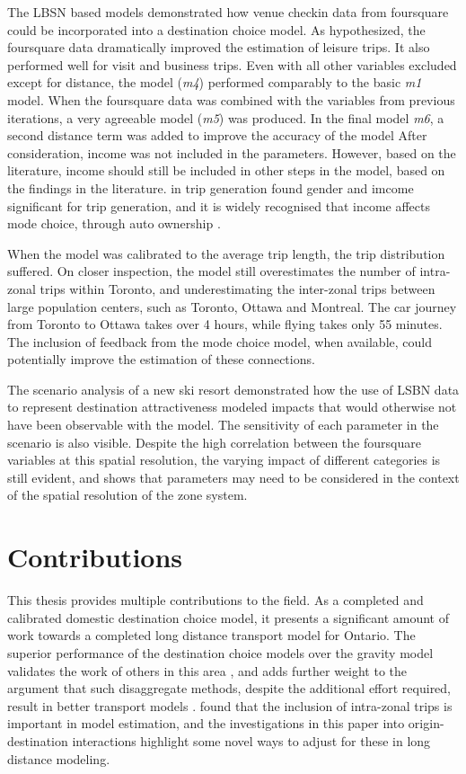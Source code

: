 The LBSN based models demonstrated how venue checkin data from foursquare could be incorporated into a destination choice model. As hypothesized, the foursquare data dramatically improved the estimation of leisure trips. It also performed well for visit and business trips. Even with all other variables excluded except for distance, the model (\textit{m4}) performed comparably to the basic \textit{m1} model. When the foursquare data was combined with the variables from previous iterations, a very agreeable model (\textit{m5}) was produced. In the final model \textit{m6}, a second distance term was added to improve the accuracy of the model
After consideration, income was not included in the parameters. However, based on the literature, income should still be included in other steps in the model, based on the findings in the literature. in trip generation\textcite{limtanakool2006participation} found gender and imcome significant for trip generation, and it is widely recognised that income affects mode choice, through auto ownership \parencite{ben1974some, miller1998urban, raphael2002car}.

When the model was calibrated to the average trip length, the trip distribution suffered. On closer inspection, the model still overestimates the number of intra-zonal trips within Toronto, and underestimating the inter-zonal trips between large population centers, such as Toronto, Ottawa and Montreal. The car journey from Toronto to Ottawa takes over 4 hours, while flying takes only 55 minutes. The inclusion of feedback from the mode choice model, when available, could potentially improve the estimation of these connections.

The scenario analysis of a new ski resort demonstrated how the use of LSBN data to represent destination attractiveness modeled impacts that would otherwise not have been observable with the model. The sensitivity of each parameter in the scenario is also visible. Despite the high correlation between the foursquare variables at this spatial resolution, the varying impact of different categories is still evident, and shows that parameters may need to be considered in the context of the spatial resolution of the zone system. 

\section{Contributions}
This thesis provides multiple contributions to the field. As a completed and calibrated domestic destination choice model, it presents a significant amount of work towards a completed long distance transport model for Ontario. The superior performance of the destination choice models over the gravity model validates the work of others in this area \parencite{Mishra13}, 
and adds further weight to the argument that such disaggregate methods, despite the additional effort required, result in better transport models \parencite{sbayti2010best, lemp2007aggregate}. \textcite{bhatta2011intrazonal} found that the inclusion of intra-zonal trips is important in model estimation, and the investigations in this paper into origin-destination interactions highlight some novel ways to adjust for these in long distance modeling.

